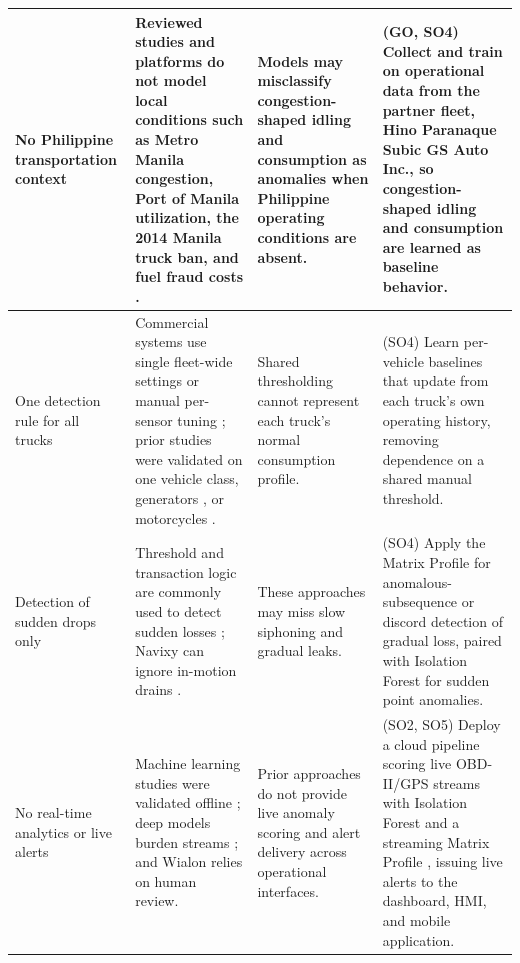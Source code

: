 {\begin{longtable}{|p{}|p{}|p{}|p{}|}
No Philippine transportation context & Reviewed studies and platforms do not model local conditions such as Metro Manila congestion, Port of Manila utilization, the 2014 Manila truck ban, and fuel fraud costs \cite{jica2025mmda_its,patalinghug2015port_congestion,llanto2017truck_ban,adb2016fuel_smuggling}. & Models may misclassify congestion-shaped idling and consumption as anomalies when Philippine operating conditions are absent. & (GO, SO4) Collect and train on operational data from the partner fleet, Hino Paranaque Subic GS Auto Inc., so congestion-shaped idling and consumption are learned as baseline behavior. \\
\hline

One detection rule for all trucks & Commercial systems use single fleet-wide settings \cite{samsara2026fuel_management} or manual per-sensor tuning \cite{navixy2026fuel_sensors}; prior studies were validated on one vehicle class, generators \cite{tatababu2024smart}, or motorcycles \cite{rs2024fuel}. & Shared thresholding cannot represent each truck's normal consumption profile. & (SO4) Learn per-vehicle baselines that update from each truck's own operating history, removing dependence on a shared manual threshold. \\
\hline

Detection of sudden drops only & Threshold and transaction logic are commonly used to detect sudden losses \cite{samsara2026fuel_management,fleetio2026fuel_management}; Navixy can ignore in-motion drains \cite{navixy2026fuel_sensors}. & These approaches may miss slow siphoning and gradual leaks. & (SO4) Apply the Matrix Profile for anomalous-subsequence or discord detection of gradual loss, paired with Isolation Forest for sudden point anomalies. \\
\hline

No real-time analytics or live alerts & Machine learning studies were validated offline \cite{fortela2023unsupervised,barbado2022interpretable}; deep models burden streams \cite{hirth2025truck_survey,cherdo2023can_anomaly}; and Wialon relies on human review. & Prior approaches do not provide live anomaly scoring and alert delivery across operational interfaces. & (SO2, SO5) Deploy a cloud pipeline scoring live OBD-II/GPS streams with Isolation Forest and a streaming Matrix Profile \cite{lu2022matrix_profile_xxiv}, issuing live alerts to the dashboard, HMI, and mobile application. \\
\hline

\end{longtable}
}
\normalsize


